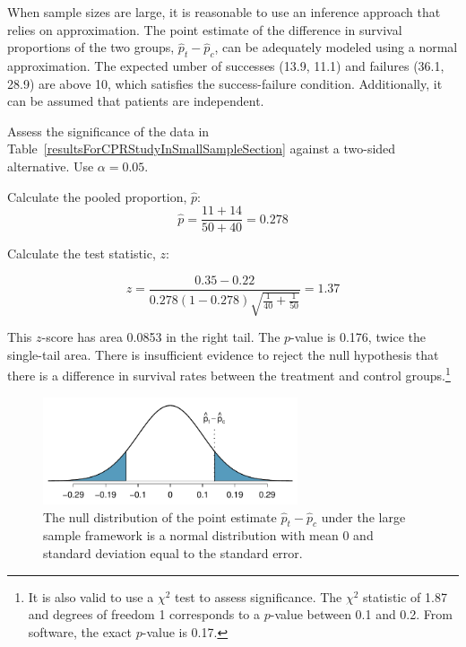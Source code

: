 When sample sizes are large, it is reasonable to use an inference approach that relies on approximation. The point estimate of the difference in survival proportions of the two groups, $\hat{p}_t - \hat{p}_c$, can be adequately modeled using a normal approximation. The expected umber of successes (13.9, 11.1) and failures (36.1, 28.9) are above 10, which satisfies the success-failure condition. Additionally, it can be assumed that patients are independent.

\begin{example}{Assess the significance of the data in Table~\ref{resultsForCPRStudyInSmallSampleSection} against a two-sided alternative. Use $\alpha = 0.05$. }

Calculate the pooled proportion, $\hat{p}$: 
\[\hat{p} = \dfrac{11 + 14}{50 + 40} = 0.278\]
	
Calculate the test statistic, $z$:

\[z = \dfrac{0.35 - 0.22 }{0.278(1-0.278)\sqrt{\frac{1}{40} + \frac{1}{50}}} =  1.37\]
	
This $z$-score has area 0.0853 in the right tail. The $p$-value is 0.176, twice the single-tail area. There is insufficient evidence to reject the null hypothesis that there is a difference in survival rates between the treatment and control groups.\footnote{It is also valid to use a $\chi^2$ test to assess significance. The $\chi^2$ statistic of 1.87 and degrees of freedom 1 corresponds to a $p$-value between 0.1 and 0.2. From software, the exact $p$-value is 0.17.}


\begin{figure}[ht]
	\centering
	\includegraphics[width=0.67\textwidth]{ch_inference_for_props_oi_biostat/figures/pValueCPRStudyLargeSampleAnalysisInSmallSampleSection/pValueCPRStudyLargeSampleAnalysisInSmallSampleSection}
	\caption{The null distribution of the point estimate $\hat{p}_t - \hat{p}_c$ under the large sample framework is a normal distribution with mean $0$ and standard deviation equal to the standard error.}
	\label{pValueCPRStudyLargeSampleAnalysisInSmallSampleSection}
\end{figure}

\end{example}



